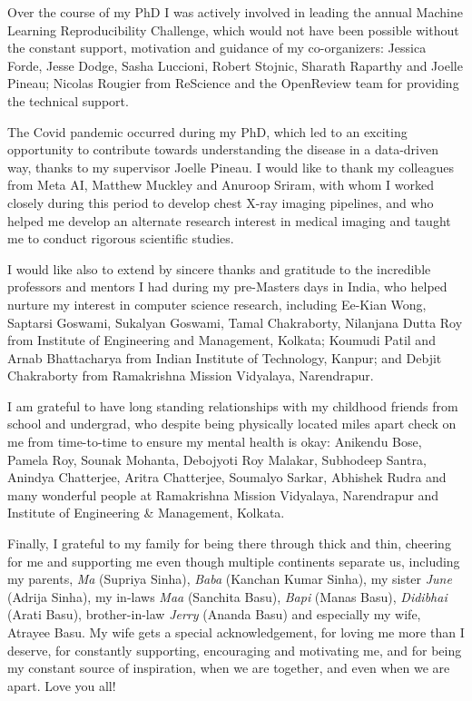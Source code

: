 \documentclass[letterpaper, 12pt]{report}
\begin{document}
Over the course of my PhD I was actively involved in leading the annual Machine Learning Reproducibility Challenge, which would not have been possible without the constant support, motivation and guidance of my co-organizers: Jessica Forde, Jesse Dodge, Sasha Luccioni, Robert Stojnic, Sharath Raparthy and Joelle Pineau; Nicolas Rougier from ReScience and the OpenReview team for providing the technical support.

The Covid pandemic occurred during my PhD, which led to an exciting opportunity to contribute towards understanding the disease in a data-driven way, thanks to my supervisor Joelle Pineau. I would like to thank my colleagues from Meta AI, Matthew Muckley and Anuroop Sriram, with whom I worked closely during this period to develop chest X-ray imaging pipelines, and who helped me develop an alternate research interest in medical imaging and taught me to conduct rigorous scientific studies.

I would like also to extend by sincere thanks and gratitude to the incredible professors and mentors I had during my pre-Masters days in India, who helped nurture my interest in computer science research, including Ee-Kian Wong, Saptarsi Goswami, Sukalyan Goswami, Tamal Chakraborty, Nilanjana Dutta Roy from Institute of Engineering and Management, Kolkata; Koumudi Patil and Arnab Bhattacharya from Indian Institute of Technology, Kanpur; and Debjit Chakraborty from Ramakrishna Mission Vidyalaya, Narendrapur.

I am grateful to have long standing relationships with my childhood friends from school and undergrad, who despite being physically located miles apart check on me from time-to-time to ensure my mental health is okay: Anikendu Bose, Pamela Roy, Sounak Mohanta, Debojyoti Roy Malakar, Subhodeep Santra, Anindya Chatterjee, Aritra Chatterjee, Soumalyo Sarkar, Abhishek Rudra and many wonderful people at Ramakrishna Mission Vidyalaya, Narendrapur and Institute of Engineering \& Management, Kolkata.

Finally, I grateful to my family for being there through thick and thin, cheering for me and supporting me even though multiple continents separate us, including my parents, \textit{Ma} (Supriya Sinha), \textit{Baba} (Kanchan Kumar Sinha), my sister \textit{June} (Adrija Sinha), my in-laws \textit{Maa} (Sanchita Basu), \textit{Bapi} (Manas Basu), \textit{Didibhai} (Arati Basu), brother-in-law \textit{Jerry} (Ananda Basu) and especially my wife, Atrayee Basu. My wife gets a special acknowledgement, for loving me more than I deserve, for constantly supporting, encouraging and motivating me, and for being my constant source of inspiration, when we are together, and even when we are apart. Love you all!
\end{document}
